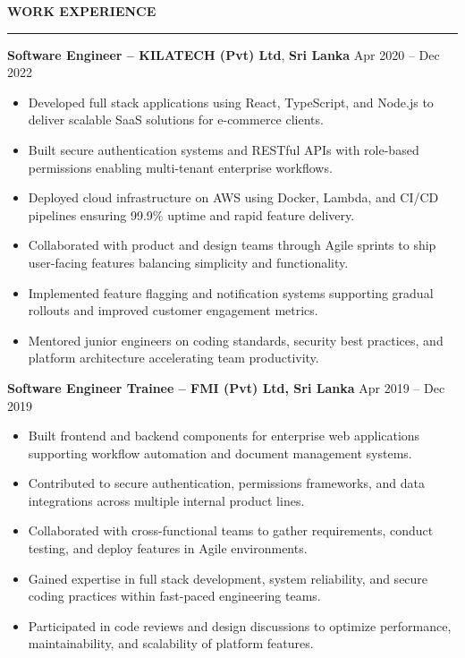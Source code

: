 \documentclass[10pt,letterpaper]{article}
\begin{document}
\vspace{8pt}

\textbf{WORK EXPERIENCE}\\[-8pt]
\noindent\rule{\textwidth}{1pt}

\vspace{-2pt}

\textbf{Software Engineer -- KILATECH (Pvt) Ltd}, \textbf{Sri Lanka} \hfill Apr 2020 -- Dec 2022

\vspace{-1pt}

\begin{itemize}
\item Developed full stack applications using React, TypeScript, and Node.js to deliver scalable SaaS solutions for e-commerce clients.
\item Built secure authentication systems and RESTful APIs with role-based permissions enabling multi-tenant enterprise workflows.
\item Deployed cloud infrastructure on AWS using Docker, Lambda, and CI/CD pipelines ensuring 99.9\% uptime and rapid feature delivery.
\item Collaborated with product and design teams through Agile sprints to ship user-facing features balancing simplicity and functionality.
\item Implemented feature flagging and notification systems supporting gradual rollouts and improved customer engagement metrics.
\item Mentored junior engineers on coding standards, security best practices, and platform architecture accelerating team productivity.
\end{itemize}

\textbf{Software Engineer Trainee -- FMI (Pvt) Ltd, Sri Lanka} \hfill Apr 2019 -- Dec 2019

\vspace{-1pt}

\begin{itemize}
\item Built frontend and backend components for enterprise web applications supporting workflow automation and document management systems.
\item Contributed to secure authentication, permissions frameworks, and data integrations across multiple internal product lines.
\item Collaborated with cross-functional teams to gather requirements, conduct testing, and deploy features in Agile environments.
\item Gained expertise in full stack development, system reliability, and secure coding practices within fast-paced engineering teams.
\item Participated in code reviews and design discussions to optimize performance, maintainability, and scalability of platform features.
\end{itemize}
\end{document}
